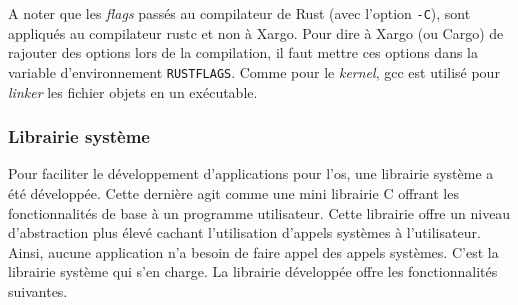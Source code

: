 A noter que les \textit{flags} passés au compilateur de Rust (avec l'option
\texttt{-C}), sont appliqués au compilateur rustc et non à Xargo. Pour
dire à Xargo (ou Cargo) de rajouter des options lors de la compilation, il faut
mettre ces options dans la variable d'environnement \texttt{RUSTFLAGS}.
Comme pour le \textit{kernel}, \acrshort{gcc} est utilisé pour \textit{linker}
les fichier objets en un exécutable.

\subsubsection{Librairie système}
Pour faciliter le développement d'applications pour l'\acrshort{os}, une librairie
système a été développée. Cette dernière agit comme une mini librairie C offrant
les fonctionnalités de base à un programme utilisateur. Cette librairie offre
un niveau d'abstraction plus élevé cachant l'utilisation d'appels systèmes
à l'utilisateur. Ainsi, aucune application n'a besoin de faire appel des appels
systèmes. C'est la librairie système qui s'en charge. La librairie développée
offre les fonctionnalités suivantes.

